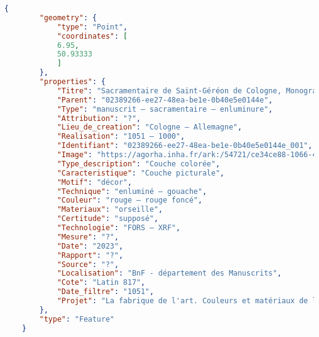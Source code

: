 \begin{lstlisting}[language=json]
	{
		"geometry": {
			"type": "Point",
			"coordinates": [
			6.95,
			50.93333
			]
		},
		"properties": {
			"Titre": "Sacramentaire de Saint-Géréon de Cologne, Monogramme VD avec la Croix, Paris, BNF, ms. Latin 817, f. 14v",
			"Parent": "02389266-ee27-48ea-be1e-0b40e5e0144e",
			"Type": "manuscrit – sacramentaire – enluminure",
			"Attribution": "?",
			"Lieu_de_creation": "Cologne – Allemagne",
			"Realisation": "1051 – 1000",
			"Identifiant": "02389266-ee27-48ea-be1e-0b40e5e0144e_001",
			"Image": "https://agorha.inha.fr/ark:/54721/ce34ce88-1066-452d-8732-1640d085e348/doc/802fb768-aec9-4d2f-a45a-c409bb9dab1b/original.PNG",
			"Type_description": "Couche colorée",
			"Caracteristique": "Couche picturale",
			"Motif": "décor",
			"Technique": "enluminé – gouache",
			"Couleur": "rouge – rouge foncé",
			"Materiaux": "orseille",
			"Certitude": "supposé",
			"Technologie": "FORS – XRF",
			"Mesure": "?",
			"Date": "2023",
			"Rapport": "?",
			"Source": "?",
			"Localisation": "BnF - département des Manuscrits",
			"Cote": "Latin 817",
			"Date_filtre": "1051",
			"Projet": "La fabrique de l'art. Couleurs et matériaux de l'enluminure"
		},
		"type": "Feature"
	}
\end{lstlisting}